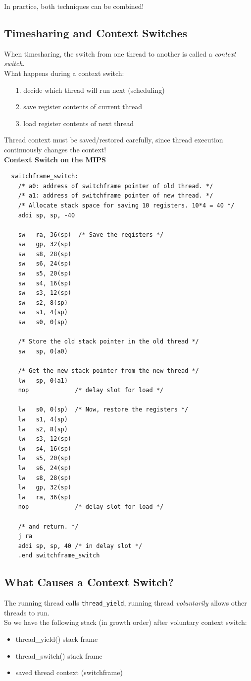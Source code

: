 \documentclass[12pt]{article}
\theoremstyle{plain}
\theoremstyle{definition}
\begin{document}
In practice, both techniques can be combined!

\subsection{Timesharing and Context Switches}
When timesharing, the switch from one thread to another is called a \emph{context switch}. \\

What happens during a context switch:
\begin{enumerate}
  \item[1.] decide which thread will run next (scheduling)
  \item[2.] save register contents of current thread
  \item[3.] load register contents of next thread
\end{enumerate}

Thread context must be saved/restored carefully, since thread execution continuously changes the context! \\

\textbf{Context Switch on the MIPS}
\begin{verbatim}
  switchframe_switch:
    /* a0: address of switchframe pointer of old thread. */
    /* a1: address of switchframe pointer of new thread. */
    /* Allocate stack space for saving 10 registers. 10*4 = 40 */
    addi sp, sp, -40

    sw   ra, 36(sp)  /* Save the registers */
    sw   gp, 32(sp)
    sw   s8, 28(sp)
    sw   s6, 24(sp)
    sw   s5, 20(sp)
    sw   s4, 16(sp)
    sw   s3, 12(sp)
    sw   s2, 8(sp)
    sw   s1, 4(sp)
    sw   s0, 0(sp)

    /* Store the old stack pointer in the old thread */
    sw   sp, 0(a0)

    /* Get the new stack pointer from the new thread */
    lw   sp, 0(a1)
    nop             /* delay slot for load */

    lw   s0, 0(sp)  /* Now, restore the registers */
    lw   s1, 4(sp)
    lw   s2, 8(sp)
    lw   s3, 12(sp)
    lw   s4, 16(sp)
    lw   s5, 20(sp)
    lw   s6, 24(sp)
    lw   s8, 28(sp)
    lw   gp, 32(sp)
    lw   ra, 36(sp)
    nop             /* delay slot for load */

    /* and return. */
    j ra
    addi sp, sp, 40 /* in delay slot */
    .end switchframe_switch
\end{verbatim}

\subsection{What Causes a Context Switch?}
The running thread calls \texttt{thread\_yield}, running thread \emph{voluntarily} allows other threads to run. \\
So we have the following stack (in growth order) after voluntary context switch:
\begin{itemize}
  \item thread\_yield() stack frame
  \item thread\_switch() stack frame
  \item saved thread context (switchframe)
\end{itemize}
\end{document}
